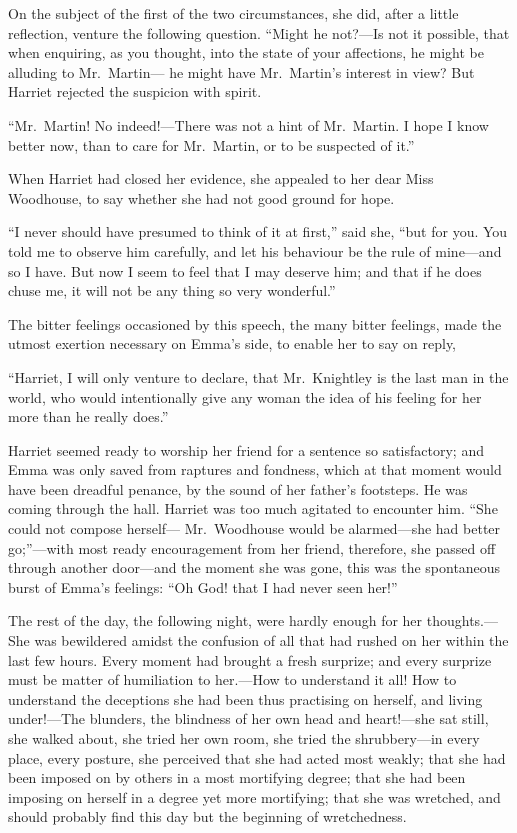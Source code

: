 On the subject of the first of the two circumstances, she did,
after a little reflection, venture the following question.
``Might he not?---Is not it possible, that when enquiring, as you thought,
into the state of your affections, he might be alluding to Mr.\ Martin---%
he might have Mr.\ Martin's interest in view?  But Harriet rejected
the suspicion with spirit.

``Mr.\ Martin!  No indeed!---There was not a hint of Mr.\ Martin.
I hope I know better now, than to care for Mr.\ Martin, or to be
suspected of it.''

When Harriet had closed her evidence, she appealed to her dear
Miss Woodhouse, to say whether she had not good ground for hope.

``I never should have presumed to think of it at first,'' said she,
``but for you.  You told me to observe him carefully, and let
his behaviour be the rule of mine---and so I have.  But now I seem
to feel that I may deserve him; and that if he does chuse me,
it will not be any thing so very wonderful.''

The bitter feelings occasioned by this speech, the many bitter
feelings, made the utmost exertion necessary on Emma's side,
to enable her to say on reply,

``Harriet, I will only venture to declare, that Mr.\ Knightley is
the last man in the world, who would intentionally give any woman
the idea of his feeling for her more than he really does.''

Harriet seemed ready to worship her friend for a sentence so satisfactory;
and Emma was only saved from raptures and fondness, which at
that moment would have been dreadful penance, by the sound of her
father's footsteps.  He was coming through the hall.  Harriet was
too much agitated to encounter him.  ``She could not compose herself---%
Mr.\ Woodhouse would be alarmed---she had better go;''---with most ready
encouragement from her friend, therefore, she passed off through
another door---and the moment she was gone, this was the spontaneous
burst of Emma's feelings:  ``Oh God! that I had never seen her!''

The rest of the day, the following night, were hardly enough
for her thoughts.---She was bewildered amidst the confusion
of all that had rushed on her within the last few hours.
Every moment had brought a fresh surprize; and every surprize
must be matter of humiliation to her.---How to understand it all!
How to understand the deceptions she had been thus practising
on herself, and living under!---The blunders, the blindness of her
own head and heart!---she sat still, she walked about, she tried her
own room, she tried the shrubbery---in every place, every posture,
she perceived that she had acted most weakly; that she had been imposed
on by others in a most mortifying degree; that she had been imposing
on herself in a degree yet more mortifying; that she was wretched,
and should probably find this day but the beginning of wretchedness.


